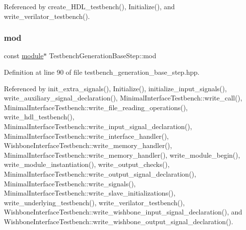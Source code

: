 Referenced by create\+\_\+\+H\+D\+L\+\_\+testbench(), Initialize(), and write\+\_\+verilator\+\_\+testbench().

\mbox{\label{classTestbenchGenerationBaseStep_af2cbe4fd4b1504c0660990a10beb3ada}} 
\subsubsection{\texorpdfstring{mod}{mod}}
{\footnotesize\ttfamily const \hyperlink{classmodule}{module}$\ast$ Testbench\+Generation\+Base\+Step\+::mod\hspace{0.3cm}{\ttfamily [protected]}}



Definition at line 90 of file testbench\+\_\+generation\+\_\+base\+\_\+step.\+hpp.



Referenced by init\+\_\+extra\+\_\+signals(), Initialize(), initialize\+\_\+input\+\_\+signals(), write\+\_\+auxiliary\+\_\+signal\+\_\+declaration(), Minimal\+Interface\+Testbench\+::write\+\_\+call(), Minimal\+Interface\+Testbench\+::write\+\_\+file\+\_\+reading\+\_\+operations(), write\+\_\+hdl\+\_\+testbench(), Minimal\+Interface\+Testbench\+::write\+\_\+input\+\_\+signal\+\_\+declaration(), Minimal\+Interface\+Testbench\+::write\+\_\+interface\+\_\+handler(), Wishbone\+Interface\+Testbench\+::write\+\_\+memory\+\_\+handler(), Minimal\+Interface\+Testbench\+::write\+\_\+memory\+\_\+handler(), write\+\_\+module\+\_\+begin(), write\+\_\+module\+\_\+instantiation(), write\+\_\+output\+\_\+checks(), Minimal\+Interface\+Testbench\+::write\+\_\+output\+\_\+signal\+\_\+declaration(), Minimal\+Interface\+Testbench\+::write\+\_\+signals(), Minimal\+Interface\+Testbench\+::write\+\_\+slave\+\_\+initializations(), write\+\_\+underlying\+\_\+testbench(), write\+\_\+verilator\+\_\+testbench(), Wishbone\+Interface\+Testbench\+::write\+\_\+wishbone\+\_\+input\+\_\+signal\+\_\+declaration(), and Wishbone\+Interface\+Testbench\+::write\+\_\+wishbone\+\_\+output\+\_\+signal\+\_\+declaration().

\mbox{\label{classTestbenchGenerationBaseStep_a7c4ae628715dcac874fc3c500d604c80}} 

